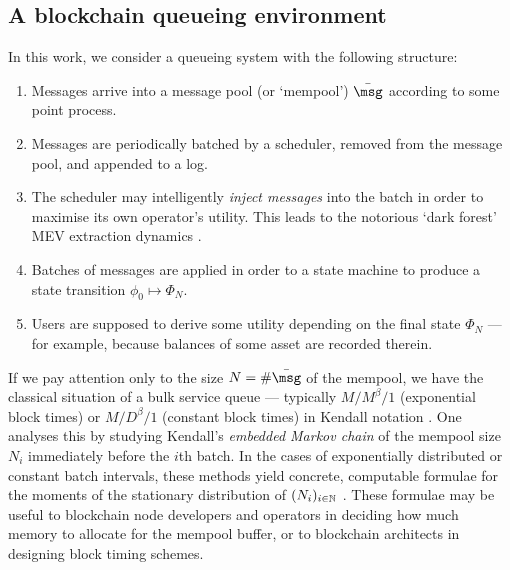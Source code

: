 \documentclass[a4paper,11pt]{article}
\begin{document}
\subsection{A blockchain queueing environment}
In this work, we consider a queueing system with the following structure:
\begin{enumerate}

  \item
    Messages arrive into a message pool (or `mempool') $\bar\msg$ according to some point process.
    
    
  \item
    Messages are periodically batched by a scheduler, removed from the message pool, and appended to a log.
    
  \item
    The scheduler may intelligently \emph{inject messages} into the batch in order to maximise its own operator's utility.
    This leads to the notorious `dark forest' MEV extraction dynamics \cite{robinson2020ethereum}.
    
  \item
    Batches of messages are applied in order to a state machine to produce a state transition $\phi_0\mapsto\Phi_N$.
  
  \item
    Users are supposed to derive some utility depending on the final state $\Phi_N$ --- for example, because balances of some asset are recorded therein.
    
\end{enumerate}
%
If we pay attention only to the size $N=\#\bar\msg$ of the mempool, we have the classical situation of a bulk service queue --- typically $M/M^\beta/1$ (exponential block times) or $M/D^\beta/1$ (constant block times) in Kendall notation \cite{kendall1953stochastic}.
%
One analyses this by studying Kendall's \emph{embedded Markov chain} of the mempool size $N_i$ immediately before the $i$th batch.
%
In the cases of exponentially distributed or constant batch intervals, these methods yield concrete, computable formulae for the moments of the stationary distribution of $(N_i)_{i\in\mathbb N}$ \cite{bailey1954queueing}.
%
These formulae may be useful to blockchain node developers and operators in deciding how much memory to allocate for the mempool buffer, or to blockchain architects in designing block timing schemes.
\end{document}
